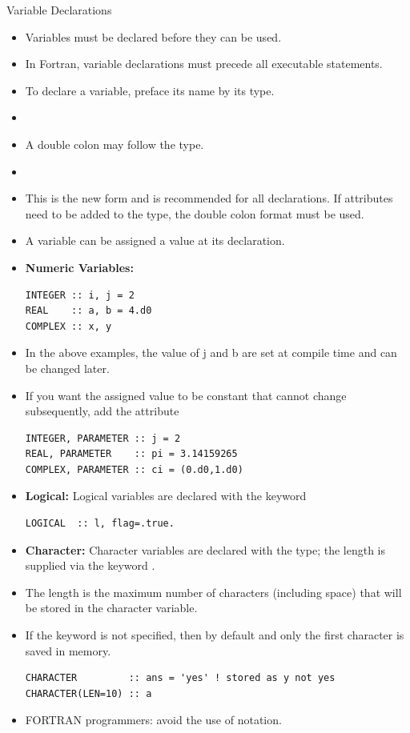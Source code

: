 \documentclass[10pt,t]{beamer}
\begin{document}
\begin{frame}{Variable Declarations}
  \begin{itemize}
    \item Variables must be declared before they can be used.
    \item In Fortran, variable declarations must precede all executable statements.
    \item To declare a variable, preface its name by its type.
    \item[] 
    \item A double colon may follow the type.
    \item[] 
    \item This is the new form and is recommended for all declarations. If attributes need to be added to the type, the double colon format must be used.
    \item A variable can be assigned a value at its declaration.
    \framebreak
    \item \textbf{Numeric Variables:}
      \begin{lstlisting}[language={[90]Fortran}]
INTEGER :: i, j = 2
REAL    :: a, b = 4.d0
COMPLEX :: x, y 
      \end{lstlisting}
    \item In the above examples, the value of j and b are set at compile time and can be changed later.
    \item If you want the assigned value to be constant that cannot change subsequently, add the attribute 
      \begin{lstlisting}[language={[90]Fortran}]
INTEGER, PARAMETER :: j = 2
REAL, PARAMETER    :: pi = 3.14159265
COMPLEX, PARAMETER :: ci = (0.d0,1.d0)
      \end{lstlisting}
    \item \textbf{Logical:} Logical variables are declared with the  keyword
      \begin{lstlisting}[language={[90]Fortran}]
LOGICAL  :: l, flag=.true.
      \end{lstlisting}
      \framebreak
    \item \textbf{Character:} Character variables are declared with the  type; the length is supplied via the keyword .
    \item The length is the maximum number of characters (including space) that will be stored in the character variable.
    \item If the  keyword is not specified, then by default  and only the first character is saved in memory. 
      \begin{lstlisting}[language={[90]Fortran}]
CHARACTER         :: ans = 'yes' ! stored as y not yes
CHARACTER(LEN=10) :: a
      \end{lstlisting}
    \item FORTRAN programmers: avoid the use of  notation.
  \end{itemize}
\end{frame}
\end{document}
